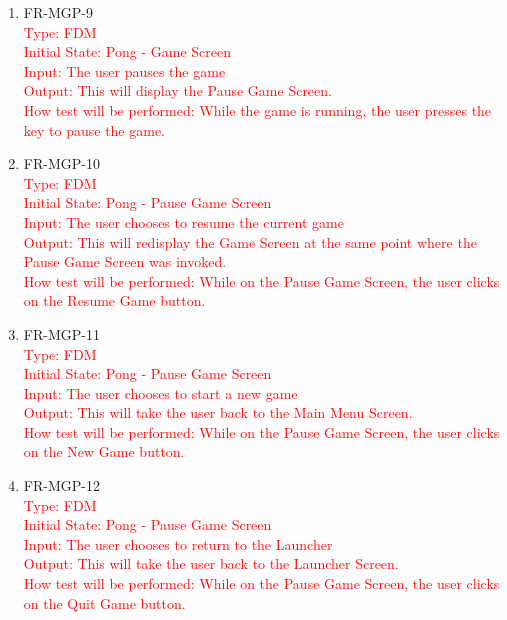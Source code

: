\documentclass[12pt, titlepage]{article}
\begin{document}
\begin{enumerate}
\item{FR-MGP-9\\}
\textcolor{red}{Type: FDM\\
Initial State: Pong - Game Screen\\
Input: The user pauses the game\\
Output: This will display the Pause Game Screen.\\
How test will be performed: While the game is running, the user presses the key to pause the game.}\\

\item{FR-MGP-10\\}
\textcolor{red}{Type: FDM\\
Initial State: Pong - Pause Game Screen\\
Input: The user chooses to resume the current game\\
Output: This will redisplay the Game Screen at the same point where the Pause Game Screen was invoked.\\
How test will be performed: While on the Pause Game Screen, the user clicks on the Resume Game button.}\\

\item{FR-MGP-11\\}
\textcolor{red}{Type: FDM\\
Initial State: Pong - Pause Game Screen\\
Input: The user chooses to start a new game\\
Output: This will take the user back to the Main Menu Screen.\\
How test will be performed: While on the Pause Game Screen, the user clicks on the New Game button.}\\

\item{FR-MGP-12\\}
\textcolor{red}{Type: FDM\\
Initial State: Pong - Pause Game Screen\\
Input: The user chooses to return to the Launcher\\
Output: This will take the user back to the Launcher Screen.\\
How test will be performed: While on the Pause Game Screen, the user clicks on the Quit Game button.}\\
    
\end{enumerate}
\end{document}
